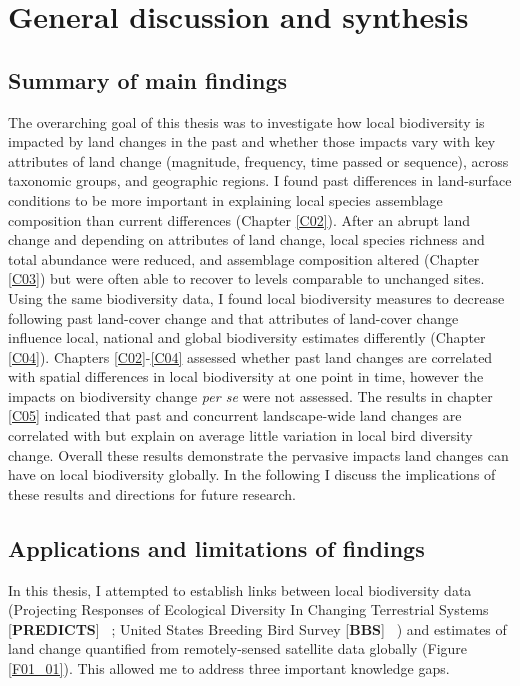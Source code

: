 \chapter{General discussion and synthesis}
\label{C06}

\section{Summary of main findings}
\label{C06_01}

The overarching goal of this thesis was to investigate how local biodiversity is impacted by land changes in the past and whether those impacts vary with key attributes of land change (\eg magnitude, frequency, time passed or sequence), across taxonomic groups, and geographic regions. I found past differences in land-surface conditions to be more important in explaining local species assemblage composition than current differences (Chapter \ref{C02}). After an abrupt land change and depending on attributes of land change, local species richness and total abundance were reduced, and assemblage composition altered (Chapter \ref{C03}) but were often able to recover to levels comparable to unchanged sites. Using the same biodiversity data, I found local biodiversity measures to decrease following past land-cover change and that attributes of land-cover change influence local, national and global biodiversity estimates differently (Chapter \ref{C04}). Chapters \ref{C02}-\ref{C04} assessed whether past land changes are correlated with spatial differences in local biodiversity at one point in time, however the impacts on biodiversity change \textit{per se} were not assessed. The results in chapter \ref{C05} indicated that past and concurrent landscape-wide land changes are correlated with but explain on average little variation in local bird diversity change. Overall these results demonstrate the pervasive impacts land changes can have on local biodiversity globally. In the following I discuss the implications of these results and directions for future research.

\section{Applications and limitations of findings}
\label{C06_02}

In this thesis, I attempted to establish links between local biodiversity data (Projecting Responses of Ecological Diversity In Changing Terrestrial Systems [\textbf{PREDICTS}] \textendash\ \cite{Hudson2016}; United States Breeding Bird Survey [\textbf{BBS}] \textendash\ \cite{Pardieck2018}) and estimates of land change quantified from remotely-sensed satellite data globally (Figure \ref{F01_01}). This allowed me to address three important knowledge gaps.

